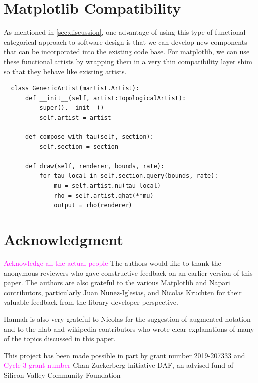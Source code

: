 \documentclass[review]{vgtc}
\newcommand{\note}[1]{\textcolor{magenta}{#1}}
\theoremstyle{definition}
\theoremstyle{remark}
\begin{document}
\pagebreak
\section{Matplotlib Compatibility}
\label{sec:appendix:artist_shim}

As mentioned in \autoref{sec:discussion}, one advantage of using this type of
functional categorical approach to software design is that we can develop new
components that can be incorporated into the existing code base. For matplotlib,
we can use these functional artists by wrapping them in a very thin compatibility
layer shim so that they behave like existing artists.

\begin{verbatim}
  class GenericArtist(martist.Artist):
      def __init__(self, artist:TopologicalArtist):
          super().__init__()
          self.artist = artist

      def compose_with_tau(self, section):
          self.section = section

      def draw(self, renderer, bounds, rate):
          for tau_local in self.section.query(bounds, rate):
              mu = self.artist.nu(tau_local)
              rho = self.artist.qhat(**mu)
              output = rho(renderer)
  \end{verbatim}

\section*{Acknowledgment}
\note{Acknowledge all the actual people}
The authors would like to thank the anonymous reviewers who gave constructive feedback on an earlier version of this paper. The authors are also grateful to  the various Matplotlib and Napari contributors, particularly Juan Nunez-Iglesias, and Nicolas Kruchten for their valuable feedback from the library developer perspective.

Hannah is also very grateful to Nicolas for the suggestion of augmented notation and to the nlab and wikipedia contributors who wrote clear explanations of many of the topics discussed in this paper.

This project has been made possible in part by grant number 2019-207333 and \note{Cycle 3 grant number} Chan Zuckerberg Initiative DAF, an advised fund of Silicon Valley Community Foundation


\ifCLASSOPTIONcaptionsoff
  \newpage
\fi




\end{document}
